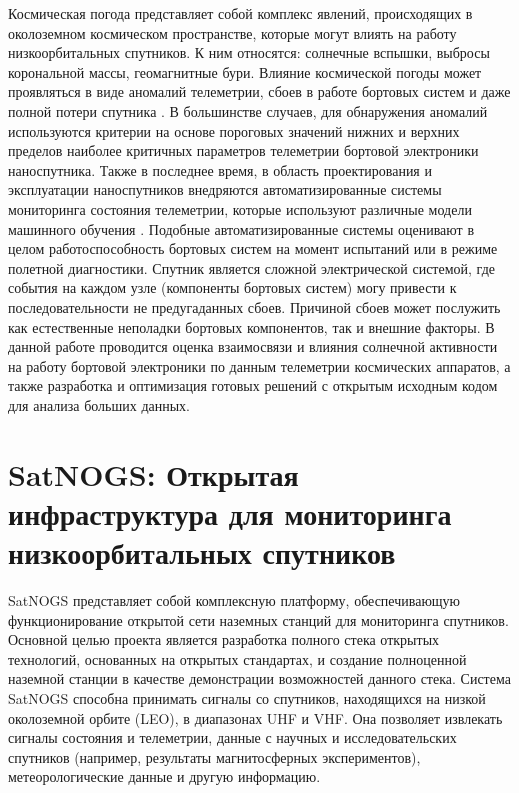 \documentclass[12pt, a4paper]{extreport}
\begin{document}
Космическая погода представляет собой комплекс явлений, происходящих в околоземном космическом пространстве, которые могут влиять на работу низкоорбитальных спутников. К ним относятся: солнечные вспышки, выбросы корональной массы, геомагнитные бури. Влияние космической погоды может проявляться в виде аномалий телеметрии, сбоев в работе бортовых систем и даже полной потери спутника \cite{green2017impact}. В большинстве случаев, для обнаружения аномалий используются критерии на основе пороговых значений нижних и верхних пределов наиболее критичных параметров телеметрии бортовой электроники наноспутника. Также в последнее время, в область проектирования и эксплуатации наноспутников внедряются автоматизированные системы мониторинга состояния телеметрии, которые используют различные модели машинного обучения \cite{schlag2018numerical}. Подобные автоматизированные системы оценивают в целом работоспособность бортовых систем на момент испытаний или в режиме полетной диагностики. Спутник является сложной электрической системой, где события на каждом узле (компоненты бортовых систем) могу привести к последовательности не предугаданных сбоев. Причиной сбоев может послужить как естественные неполадки бортовых компонентов, так и внешние факторы.  В данной работе проводится оценка взаимосвязи и влияния солнечной активности на работу бортовой электроники по данным телеметрии космических аппаратов, а также разработка и оптимизация готовых решений с открытым исходным кодом для анализа больших данных.

\newpage

\section{SatNOGS: Открытая инфраструктура для мониторинга низкоорбитальных спутников}

SatNOGS представляет собой комплексную платформу, обеспечивающую функционирование открытой сети наземных станций для мониторинга спутников. Основной целью проекта является разработка полного стека открытых технологий, основанных на открытых стандартах, и создание полноценной наземной станции в качестве демонстрации возможностей данного стека. Система SatNOGS способна принимать сигналы со спутников, находящихся на низкой околоземной орбите (LEO), в диапазонах UHF и VHF. Она позволяет извлекать сигналы состояния и телеметрии, данные с научных и исследовательских спутников (например, результаты магнитосферных экспериментов), метеорологические данные и другую информацию.
\end{document}
